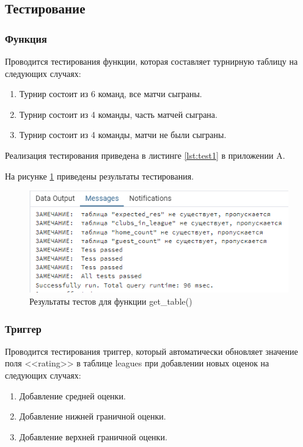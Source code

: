 \subsection{Тестирование}
\subsubsection{Функция}
Проводится тестирования функции, которая составляет турнирную таблицу на следующих случаях:
\begin{enumerate}
	\item Турнир состоит из 6 команд, все матчи сыграны.
	\item Турнир состоит из 4 команды, часть матчей сыграна.
	\item Турнир состоит из 4 команды, матчи не были сыграны.
\end{enumerate}

Реализация тестирования приведена в листинге \ref{lst:test1} в приложении A.

На рисунке \ref{img:testfunction} приведены результаты тестирования.
\begin{figure}[h]
	\centering
	\includegraphics[height=0.2\textheight]{img/testfunction.png}
	\caption{Результаты тестов для функции get\_table()}
	\label{img:testfunction}
\end{figure}

\subsubsection{Триггер}
Проводится тестирования триггер, который автоматически обновляет значение поля <<rating>> в таблице leagues при добавлении новых оценок на следующих случаях:
\begin{enumerate}
	\item Добавление средней оценки.
	\item Добавление нижней граничной оценки.
	\item Добавление верхней граничной оценки.
\end{enumerate}

